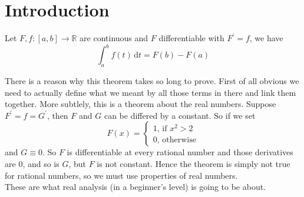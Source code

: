 \section{Introduction}
\begin{theorem}
    Let $F,f:[a,b]\to\mathbb R$ are continuous and $F$ differentiable with $F^\prime=f$, we have
    $$\int_a^bf(t)\,\mathrm dt=F(b)-F(a)$$
\end{theorem}
There is a reason why this theorem takes so long to prove.
First of all obvious we need to actually define what we meant by all those terms in there and link them together.
More subtlely, this is a theorem about the real numbers.
Suppose $F^\prime=f=G^\prime$, then $F$ and $G$ can be differed by a constant.
So if we set
$$F(x)=\begin{cases}
    1\text{, if $x^2>2$}\\
    0\text{, otherwise}
\end{cases}$$
and $G\equiv 0$.
So $F$ is differentiable at every rational number and those derivatives are $0$, and so is $G$, but $F$ is not constant.
Hence the theorem is simply not true for rational numbers, so we must use properties of real numbers.\\
These are what real analysis (in a beginner's level) is going to be about.